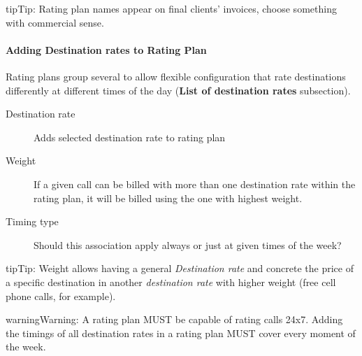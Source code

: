 \documentclass[letterpaper,10pt,english]{sphinxmanual}
\begin{document}
\begin{notice}{tip}{Tip:}
Rating plan names appear on final clients' invoices, choose something with commercial sense.
\end{notice}


\paragraph{Adding Destination rates to Rating Plan}
\label{administration_portal/brand/billing/rating_plans:adding-destination-rates-to-rating-plan}
Rating plans group several {\hyperref[administration_portal/brand/billing/destination_rates:destination\string-rates]{}} to allow flexible configuration that rate destinations differently
at different times of the day (\textbf{List of destination rates} subsection).
\begin{description}
\item[{Destination rate}] \leavevmode{}\label{administration_portal/brand/billing/rating_plans:term-destination-rate}
Adds selected destination rate to rating plan

\item[{Weight}] \leavevmode{}\label{administration_portal/brand/billing/rating_plans:term-weight}
If a given call can be billed with more than one destination rate within the rating plan,
it will be billed using the one with highest weight.

\item[{Timing type}] \leavevmode{}\label{administration_portal/brand/billing/rating_plans:term-timing-type}
Should this association apply always or just at given times of the week?

\end{description}

\begin{notice}{tip}{Tip:}
Weight allows having a general \emph{Destination rate} and concrete the price of
a specific destination in another \emph{destination rate} with higher weight (free cell
phone calls, for example).
\end{notice}

\begin{notice}{warning}{Warning:}
A rating plan MUST be capable of rating calls 24x7. Adding the timings of all destination rates in a rating
plan MUST cover every moment of the week.
\end{notice}
\end{document}
